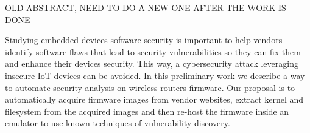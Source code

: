 OLD ABSTRACT, NEED TO DO A NEW ONE AFTER THE WORK IS DONE

Studying embedded devices software security is important to help vendors identify software flaws that lead to security vulnerabilities so they can fix them and enhance their devices security. This way, a cybersecurity attack leveraging insecure IoT devices can be avoided. In this preliminary work we describe a way to automate security analysis on wireless routers firmware. Our proposal is to automatically acquire firmware images from vendor websites, extract kernel and filesystem from the acquired images and then re-host the firmware inside an emulator to use known techniques of vulnerability discovery.

